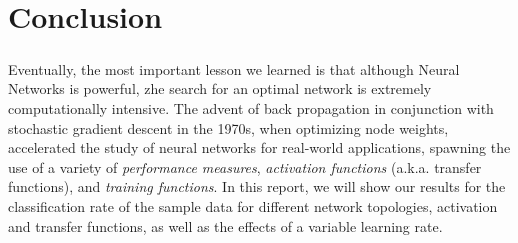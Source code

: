 \documentclass[a4paper,12pt,oneside,final]{report}
\begin{document}
\chapter{Conclusion}
\paragraph{}
Eventually, the most important lesson we learned is that although Neural Networks is powerful, zhe search for an optimal network is extremely computationally intensive.  The advent of back propagation in conjunction with stochastic gradient descent in the 1970s, when optimizing node weights, accelerated the study of neural networks for real-world applications, spawning the use of a variety of \emph{performance measures}, \emph{activation functions} (a.k.a. transfer functions), and \emph{training functions}.  In this report, we will show our results for the classification rate of the sample data for different network topologies, activation and transfer functions, as well as the effects of a variable learning rate. 




\begin{appendices}

\end{appendices}
\end{document}
